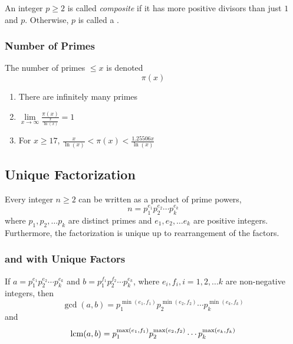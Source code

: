 \begin{definition}[Composite]\label{def:Composite}
  An integer $p \geq 2$ is called \emph{composite} if it has more positive divisors than just $1$ and $p$.
  Otherwise, $p$ is called a \emph{}.
\end{definition}

\subsubsection{Number of Primes}\label{subsubsec:Number_of_Primes}
The number of primes $\leq x$ is denoted
\begin{equation}\label{eq:Number_of_Primes}
  \pi(x)
\end{equation}
\begin{enumerate}[noitemsep]
\item There are infinitely many primes
\item $\lim\limits_{x \rightarrow \infty} \frac{\pi(x)}{\frac{x}{\ln(x)}} = 1$
\item For $x \geq 17$, $\frac{x}{\ln(x)} < \pi(x) < \frac{1.25506x}{\ln(x)}$
\end{enumerate}

\subsection{Unique Factorization}\label{subsec:Unique_Factorization}
\begin{theorem}\label{thm:Unique_Factorization_Theorem}
  Every integer $n \geq 2$ can be written as a product of prime powers,
  \begin{equation*}
    n = p_{1}^{e_{1}} p_{2}^{e_{2}} \cdots p_{k}^{e_{k}}
  \end{equation*}
  where $p_{1}, p_{2}, \ldots p_{k}$ are distinct primes and $e_{1}, e_{2}, \ldots e_{k}$ are positive integers.
  Furthermore, the factorization is unique up to rearrangement of the factors.
\end{theorem}

\subsubsection{ and  with Unique Factors}\label{subsubsec:GCD_LCM_Unique_Factors}
If $a = p_{1}^{e_{1}} p_{2}^{e_{2}} \cdots p_{k}^{e_{k}}$ and $b = p_{1}^{f_{1}} p_{2}^{f_{2}} \cdots p_{k}^{e_{k}}$, where $e_{i}, f_{i}, i = 1, 2, \ldots k$ are non-negative integers, then
\begin{equation}\label{eq:GCD_Unique_Factors}
  \gcd(a, b) = p_{1}^{\min(e_{1}, f_{1})} p_{2}^{\min(e_{2}, f_{2})} \cdots p_{k}^{\min(e_{k}, f_{k})}
\end{equation}
and
\begin{equation}\label{eq:LCM_Unique_Factors}
  \operatorname{\text{lcm}}(a, b) = p_{1}^{\max(e_{1}, f_{1})} p_{2}^{\max(e_{2}, f_{2})} \cdots p_{k}^{\max(e_{k}, f_{k})}
\end{equation}

